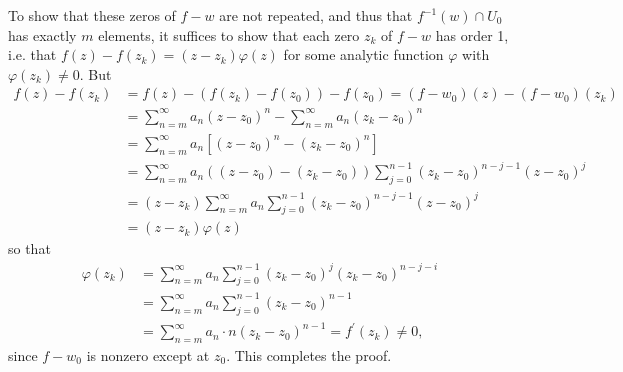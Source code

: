\documentclass{article}
\begin{document}
\begin{Answer}
To show that these
zeros of $f - w$ are not repeated, and thus that
$f^{-1}(w) \cap U_0$ has exactly $m$ elements, it suffices to show
that each zero $z_k$ of $f - w$ has order 1, i.e. that
$f(z) - f(z_k) = (z - z_k)\varphi(z)$ for some analytic function $\varphi$ with
$\varphi(z_k) \neq 0$. But
\begin{align*}
   f(z) - f(z_k)
&= f(z) - (f(z_k) - f(z_0)) - f(z_0)
 = (f - w_0)(z) - (f - w_0)(z_k) \\
&= \sum_{n=m}^\infty a_n (z - z_0)^n
 - \sum_{n=m}^\infty a_n (z_k - z_0)^n \\
&= \sum_{n=m}^\infty
     a_n
     \left[
       (z - z_0)^n - (z_k - z_0)^n
     \right] \\
&= \sum_{n=m}^\infty
      a_n
      ((z - z_0) - (z_k - z_0))
      \sum_{j=0}^{n-1}
        (z_k - z_0)^{n - j - 1}
        (z - z_0)^{j} \\
&= (z - z_k)
   \sum_{n=m}^\infty
     a_n
     \sum_{j=0}^{n-1}
       (z_k - z_0)^{n - j - 1}
       (z - z_0)^{j} \\
&= (z - z_k) \varphi(z)
\end{align*}
so that
\begin{align*}
   \varphi(z_k)
&= \sum_{n=m}^\infty
     a_n
     \sum_{j=0}^{n-1}
       (z_k - z_0)^j
       (z_k - z_0)^{n - j - i} \\
&= \sum_{n=m}^\infty
     a_n
     \sum_{j=0}^{n-1}
       (z_k - z_0)^{n-1} \\
&= \sum_{n=m}^\infty
     a_n \cdot n (z_k - z_0)^{n-1}
 = f^\prime(z_k) \neq 0,
\end{align*}
since $f - w_0$ is nonzero except at $z_0$. This completes the proof.
\end{Answer}
\end{document}
